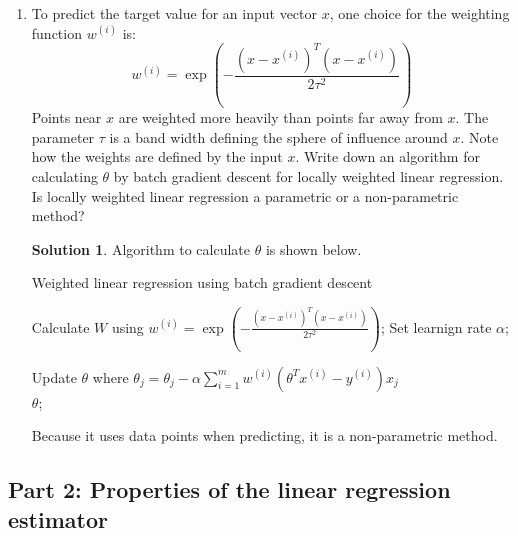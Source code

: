 \documentclass[]{book}
\theoremstyle{definition}
\newtheorem*{soln}{Solution}
\begin{document}
\begin{enumerate}
	\item To predict the target value for an input vector $x$, one choice for the weighting function $w^{(i)}$ is:
	$$w^{(i)}= \exp({-\frac{(x -x^{(i)})^T (x-x^{(i)})}{2 \tau^2}})$$
	Points near $x$ are weighted more heavily than points far away from $x$. The parameter $\tau$ is a band width defining the sphere of influence around $x$. Note how the weights are defined by the input $x$. Write down an algorithm for calculating $\theta$ by batch gradient descent for locally weighted linear regression. Is locally weighted linear regression a parametric or a non-parametric method?
	
	\begin{soln}
		Algorithm to calculate $\theta$ is shown below. 
		
		{\centering
			\begin{minipage}{.75\linewidth}
				\begin{algorithm}[H]
					\caption{Weighted linear regression using batch gradient descent}  
					\begin{algorithmic}[1]  
						\State Calculate $W$ using $w^{(i)}= \exp({-\frac{(x -x^{(i)})^T (x-x^{(i)})}{2 \tau^2}})$;  
						\State Set learnign rate $\alpha$;
						
						\State Update $\theta$ where $\theta_j = \theta_j - \alpha \sum_{i = 1}^{m}w^{(i)}(\theta^Tx^{(i)}-y^{(i)})x_j$ 
						\EndFor 
						\\  
						\Return $\theta$;  
					\end{algorithmic}  
				\end{algorithm}   
			\end{minipage}
		}
		  
		Because it uses data points when predicting, it is a non-parametric method.
	\end{soln}
\end{enumerate}

\subsection*{Part 2: Properties of the linear regression estimator}
\end{document}
